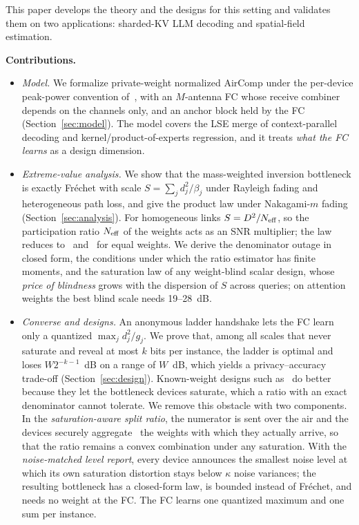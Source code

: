 This paper develops the theory and the designs for this setting and validates them on two applications: sharded-KV LLM decoding and spatial-field estimation.

\textbf{Contributions.}
\begin{itemize}
\item \emph{Model.} We formalize private-weight normalized AirComp under the per-device peak-power convention of~\cite{yang2026airmoe}, with an $M$-antenna FC whose receive combiner depends on the channels only, and an anchor block held by the FC (Section~\ref{sec:model}). The model covers the LSE merge of context-parallel decoding and kernel/product-of-experts regression, and it treats \emph{what the FC learns} as a design dimension.
\item \emph{Extreme-value analysis.} We show that the mass-weighted inversion bottleneck is exactly Fr\'echet with scale $S=\sum_j d_j^2/\beta_j$ under Rayleigh fading and heterogeneous path loss, and give the product law under Nakagami-$m$ fading (Section~\ref{sec:analysis}). For homogeneous links $S=D^2/N_{\mathrm{eff}}$, so the participation ratio $N_{\mathrm{eff}}$ of the weights acts as an SNR multiplier; the law reduces to~\cite[Cor.~2]{liu2020scaling} and~\cite[Lemma~5]{chen2024view} for equal weights. We derive the denominator outage in closed form, the conditions under which the ratio estimator has finite moments, and the saturation law of any weight-blind scalar design, whose \emph{price of blindness} grows with the dispersion of $S$ across queries; on attention weights the best blind scale needs 19--28~dB.
\item \emph{Converse and designs.} An anonymous ladder handshake lets the FC learn only a quantized $\max_j d_j^2/g_j$. We prove that, among all scales that never saturate and reveal at most $k$ bits per instance, the ladder is optimal and loses $W2^{-k-1}$~dB on a range of $W$~dB, which yields a privacy--accuracy trade-off (Section~\ref{sec:design}). Known-weight designs such as~\cite{yang2026airmoe} do better because they let the bottleneck devices saturate, which a ratio with an exact denominator cannot tolerate. We remove this obstacle with two components. In the \emph{saturation-aware split ratio}, the numerator is sent over the air and the devices securely aggregate~\cite{bonawitz2017secagg} the weights with which they actually arrive, so that the ratio remains a convex combination under any saturation. With the \emph{noise-matched level report}, every device announces the smallest noise level at which its own saturation distortion stays below $\kappa$ noise variances; the resulting bottleneck has a closed-form law, is bounded instead of Fr\'echet, and needs no weight at the FC. The FC learns one quantized maximum and one sum per instance.

\end{itemize}
